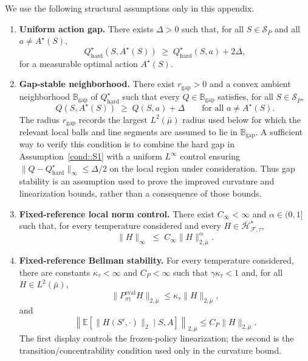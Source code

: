 \documentclass{article}
\theoremstyle{plain}
\theoremstyle{definition}
\theoremstyle{remark}
\newcommand{\E}{\mathbb{E}}
\begin{document}
We use the following structural assumptions only in this appendix.

\begin{enumerate}[label=\textbf{S\arabic*}, ref={S\arabic*}, leftmargin=1.5em]

\item \label{cond::S1} \textbf{Uniform action gap.}
There exists $\Delta>0$ such that, for all $S\in\mathcal S_{\bar P}$ and all
$a\neq A^\star(S)$,
\[
Q^\star_{\mathrm{hard}}(S, A^\star(S))
\;\ge\;
Q^\star_{\mathrm{hard}}(S,a) + 2\Delta,
\]
for a measurable optimal action $A^\star(S)$.

\item \label{cond::S2} \textbf{Gap-stable neighborhood.}
There exist $r_{\mathrm{gap}}>0$ and a convex ambient neighborhood
$\mathbb B_{\mathrm{gap}}$ of $Q^\star_{\mathrm{hard}}$ such that every
$Q\in\mathbb B_{\mathrm{gap}}$ satisfies, for all $S\in\mathcal S_{\bar P}$,
\[
Q(S,A^\star(S))
\;\ge\;
Q(S,a)+\Delta
\qquad\text{for all }a\neq A^\star(S).
\]
The radius $r_{\mathrm{gap}}$ records the largest $L^2(\bar\mu)$ radius used
below for which the relevant local balls and line segments are assumed to lie in
$\mathbb B_{\mathrm{gap}}$. A sufficient way to verify this condition is to
combine the hard gap in Assumption~\ref{cond::S1} with a uniform
$L^\infty$ control ensuring
$\|Q-Q^\star_{\mathrm{hard}}\|_\infty\le \Delta/2$ on the local region under
consideration. Thus gap stability is an assumption used to prove the improved
curvature and linearization bounds, rather than a consequence of those bounds.

\item \label{cond::S3} \textbf{Fixed-reference local norm control.}
There exist $C_{\bar\infty}<\infty$ and $\alpha\in(0,1]$ such that, for every
temperature considered and every
$H\in\bar{\mathcal H}_{\mathcal F,\tau}^\star$,
\[
\|H\|_\infty
\;\le\;
C_{\bar\infty}\|H\|_{2,\bar\mu}^{\alpha}.
\]

\item \label{cond::S4} \textbf{Fixed-reference Bellman stability.}
For every temperature considered, there are constants
$\kappa_\tau<\infty$ and $C_P<\infty$ such that $\gamma\kappa_\tau<1$ and, for
all $H\in L^2(\bar\mu)$,
\[
\|P^{\mathrm{eval}}_{\pi^\star_\tau}H\|_{2,\bar\mu}
\le
\kappa_\tau\|H\|_{2,\bar\mu},
\]
and
\[
\left\|
\E\!\left[\|H(S',\cdot)\|_2\mid S,A\right]
\right\|_{2,\bar\mu}
\le
C_P\|H\|_{2,\bar\mu}.
\]
The first display controls the frozen-policy linearization; the second is the
transition/concentrability condition used only in the curvature bound.
\end{enumerate}
\end{document}

